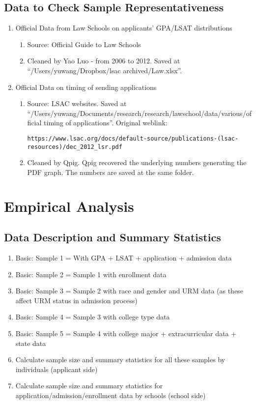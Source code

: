 \documentclass[12pt]{article}
\begin{document}
\subsection{Data to Check Sample Representativeness}
\begin{enumerate}
\item Official Data from Law Schools on applicants' GPA/LSAT distributions
\begin{enumerate}
\item Source: Official Guide to Law Schools
\item Cleaned by Yao Luo - from 2006 to 2012. Saved at ``/Users/yuwang/Dropbox/lsac archived/Law.xlsx''.
\end{enumerate}
\item Official Data on timing of sending applications
\begin{enumerate}
\item Source: LSAC websites. Saved at ``/Users/yuwang/Documents/research/research/lawschool/data/various/official timing of applications''. Original weblink:
\small
\begin{verbatim}
https://www.lsac.org/docs/default-source/publications-(lsac-resources)/dec_2012_lsr.pdf
\end{verbatim}
\normalsize
\item Cleaned by Qpig. Qpig recovered the underlying numbers generating the PDF graph. The numbers are saved at the same folder.
\end{enumerate}
\end{enumerate}

\section{Empirical Analysis}
\subsection{Data Description and Summary Statistics}
\begin{enumerate}
\item Basic: Sample 1 = With GPA + LSAT + application + admission data
\item Basic: Sample 2 = Sample 1 with enrollment data
\item Basic: Sample 3 = Sample 2 with race and gender and URM data (as these affect URM status in admission process)
\item Basic: Sample 4 = Sample 3 with college type data
\item Basic: Sample 5 = Sample 4 with college major + extracurricular data + state data
\item Calculate sample size and summary statistics for all these samples by individuals (applicant side)
\item Calculate sample size and summary statistics for application/admission/enrollment data by schools (school side)
\end{enumerate}
\end{document}
